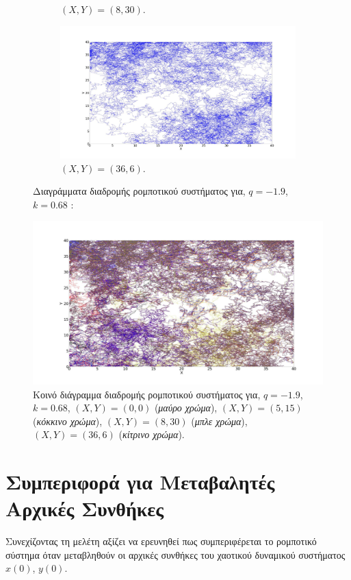 \begin{figure}[ht]
\begin{subfigure}[b]{0.55\textwidth}
		\caption{$(X,Y) = (8,30)$.}
		\label{f:g90}
	\end{subfigure}
	\hfill
	\begin{subfigure}[b]{0.55\textwidth}
		\centering
		\includegraphics[width=\textwidth]{LateX images/log/XY1/g4-1.9}
		\caption{$(X,Y) = (36,6)$.}
		\label{f:g91}
	\end{subfigure}
	\hfill
	\caption{Διαγράμματα διαδρομής ρομποτικού συστήματος για, $q = -1.9$, $k = 0.68$ :}
\end{figure}


\begin{figure}[ht]
	\centering
	\includegraphics[width=1\linewidth]{LateX images/log/XY1/g1}
	\caption{Κοινό διάγραμμα διαδρομής ρομποτικού συστήματος για, $q = -1.9$, $k = 0.68$, $(X,Y) = (0,0)$ (\emph{μαύρο χρώμα}), $(X,Y) = (5,15)$ (\emph{κόκκινο χρώμα}), $(X,Y) = (8,30)$ (\emph{μπλε χρώμα}), $(X,Y) = (36,6)$ (\emph{κίτρινο χρώμα}).}
	\label{f:g92}	
\end{figure}


\clearpage


\section{Συμπεριφορά για Μεταβαλητές Αρχικές Συνθήκες}
\label{sec:g3}
Συνεχίζοντας τη μελέτη αξίζει να ερευνηθεί πως συμπεριφέρεται το ρομποτικό σύστημα όταν μεταβληθούν οι αρχικές συνθήκες του χαοτικού δυναμικού συστήματος $x(0)$, $y(0)$. 

